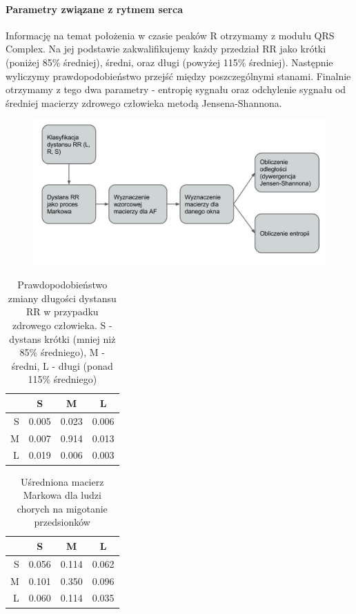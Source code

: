 \paragraph{Parametry związane z rytmem serca}
Informację na temat położenia w czasie peaków R otrzymamy z modułu QRS Complex. 
Na jej podstawie zakwalifikujemy każdy przedział RR jako krótki (poniżej 85\% średniej), 
średni, oraz długi (powyżej 115\% średniej). 
Następnie wyliczymy prawdopodobieństwo przejść między poszczególnymi stanami. 
Finalnie otrzymamy z tego dwa parametry - 
entropię sygnału oraz odchylenie sygnału od średniej macierzy zdrowego człowieka metodą Jensena-Shannona.
\begin{figure}[ht]
\centering
\includegraphics[width=12cm]{ATRIAL_FIBR/img/RRMethodFlow}
\end{figure}

\begin{table}[!ht]
  \centering
  \begin{tabular}{|r|ccc|}
    \hline 
    & S & M & L \\
    \hline
    S & 0.005 & 0.023 & 0.006 \\
    M & 0.007 & 0.914 & 0.013 \\
    L & 0.019 & 0.006 & 0.003 \\
    \hline
  \end{tabular}
  \caption[Macierz Markowa - zdrowy człowiek]
          {Prawdopodobieństwo zmiany długości dystansu RR w przypadku zdrowego człowieka. 
            S - dystans krótki (mniej niż 85\% średniego), 
            M - średni, L - długi (ponad 115\% średniego)}
\end{table}

\begin{table}[!ht]
  \centering
  \begin{tabular}{|r|ccc|}
    \hline 
    & S & M & L \\
    \hline
    S & 0.056 & 0.114 & 0.062 \\
    M & 0.101 & 0.350 & 0.096 \\
    L & 0.060 & 0.114 & 0.035 \\
    \hline
  \end{tabular}
  \caption[Macierz Markowa - chory człowiek]{Uśredniona macierz Markowa dla ludzi chorych na migotanie przedsionków}
\end{table}

